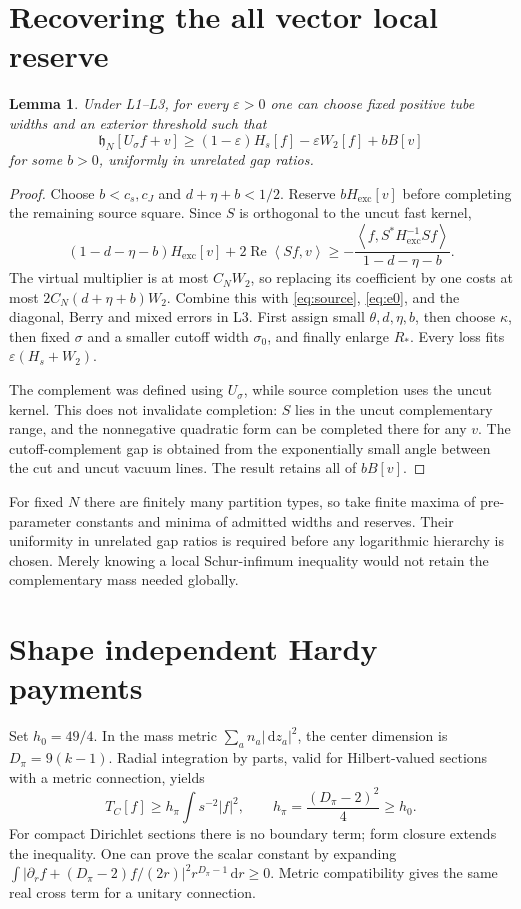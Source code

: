 \documentclass[11pt,letterpaper]{article}
\newtheorem{lemma}[theorem]{Lemma}
\theoremstyle{definition}\newtheorem{hypothesis}[theorem]{Hypothesis}
\newcommand{\Rea}{\operatorname{Re}}
\newcommand{\exc}{\mathrm{exc}}
\newcommand{\dd}{\,\mathrm{d}}
\newcommand{\hh}{\mathfrak h}
\newcommand{\ip}[2]{\left\langle #1,#2\right\rangle}
\numberwithin{equation}{section}
\begin{document}
\section{Recovering the all vector local reserve}
\begin{lemma}\label{lem:reserve}
Under L1--L3, for every $\varepsilon>0$ one can choose fixed positive tube widths and an exterior threshold such that
\begin{equation}
 \hh_N[U_\sigma f+v]\ge(1-\varepsilon)H_s[f]-\varepsilon W_2[f]+bB[v]\label{eq:reserve}
\end{equation}
for some $b>0$, uniformly in unrelated gap ratios.
\end{lemma}
\begin{proof}
Choose $b<c_s,c_J$ and $d+\eta+b<1/2$. Reserve $bH_{\exc}[v]$ before completing the remaining source square. Since $S$ is orthogonal to the uncut fast kernel,
\begin{equation}
 (1-d-\eta-b)H_{\exc}[v]+2\Rea\ip{Sf}{v}
 \ge-\frac{\ip{f}{S^*H_{\exc}^{-1}Sf}}{1-d-\eta-b}.
\end{equation}
The virtual multiplier is at most $C_NW_2$, so replacing its coefficient by one costs at most $2C_N(d+\eta+b)W_2$. Combine this with \eqref{eq:source}, \eqref{eq:e0}, and the diagonal, Berry and mixed errors in L3. First assign small $\theta,d,\eta,b$, then choose $\kappa$, then fixed $\sigma$ and a smaller cutoff width $\sigma_0$, and finally enlarge $R_*$. Every loss fits $\varepsilon(H_s+W_2)$.

The complement was defined using $U_\sigma$, while source completion uses the uncut kernel. This does not invalidate completion: $S$ lies in the uncut complementary range, and the nonnegative quadratic form can be completed there for any $v$. The cutoff-complement gap is obtained from the exponentially small angle between the cut and uncut vacuum lines. The result retains all of $bB[v]$.
\end{proof}
For fixed $N$ there are finitely many partition types, so take finite maxima of pre-parameter constants and minima of admitted widths and reserves. Their uniformity in unrelated gap ratios is required before any logarithmic hierarchy is chosen. Merely knowing a local Schur-infimum inequality would not retain the complementary mass needed globally.

\section{Shape independent Hardy payments}
Set $h_0=49/4$. In the mass metric $\sum_an_a|\dd z_a|^2$, the center dimension is $D_\pi=9(k-1)$. Radial integration by parts, valid for Hilbert-valued sections with a metric connection, yields
\begin{equation}
 T_C[f]\ge h_\pi\int s^{-2}|f|^2,
 \qquad h_\pi=\frac{(D_\pi-2)^2}{4}\ge h_0.\label{eq:centerhardy}
\end{equation}
For compact Dirichlet sections there is no boundary term; form closure extends the inequality. One can prove the scalar constant by expanding
$\int|\partial_rf+(D_\pi-2)f/(2r)|^2r^{D_\pi-1}\dd r\ge0$.
Metric compatibility gives the same real cross term for a unitary connection.
\end{document}
